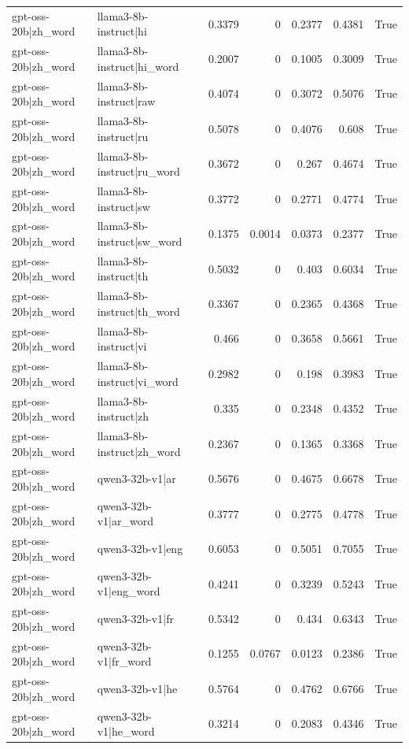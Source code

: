 \begin{table}
\begin{tabular}{l l r r r r l}
gpt-oss-20b|zh_word & llama3-8b-instruct|hi & 0.3379 & 0 & 0.2377 & 0.4381 & True \\
gpt-oss-20b|zh_word & llama3-8b-instruct|hi_word & 0.2007 & 0 & 0.1005 & 0.3009 & True \\
gpt-oss-20b|zh_word & llama3-8b-instruct|raw & 0.4074 & 0 & 0.3072 & 0.5076 & True \\
gpt-oss-20b|zh_word & llama3-8b-instruct|ru & 0.5078 & 0 & 0.4076 & 0.608 & True \\
gpt-oss-20b|zh_word & llama3-8b-instruct|ru_word & 0.3672 & 0 & 0.267 & 0.4674 & True \\
gpt-oss-20b|zh_word & llama3-8b-instruct|sw & 0.3772 & 0 & 0.2771 & 0.4774 & True \\
gpt-oss-20b|zh_word & llama3-8b-instruct|sw_word & 0.1375 & 0.0014 & 0.0373 & 0.2377 & True \\
gpt-oss-20b|zh_word & llama3-8b-instruct|th & 0.5032 & 0 & 0.403 & 0.6034 & True \\
gpt-oss-20b|zh_word & llama3-8b-instruct|th_word & 0.3367 & 0 & 0.2365 & 0.4368 & True \\
gpt-oss-20b|zh_word & llama3-8b-instruct|vi & 0.466 & 0 & 0.3658 & 0.5661 & True \\
gpt-oss-20b|zh_word & llama3-8b-instruct|vi_word & 0.2982 & 0 & 0.198 & 0.3983 & True \\
gpt-oss-20b|zh_word & llama3-8b-instruct|zh & 0.335 & 0 & 0.2348 & 0.4352 & True \\
gpt-oss-20b|zh_word & llama3-8b-instruct|zh_word & 0.2367 & 0 & 0.1365 & 0.3368 & True \\
gpt-oss-20b|zh_word & qwen3-32b-v1|ar & 0.5676 & 0 & 0.4675 & 0.6678 & True \\
gpt-oss-20b|zh_word & qwen3-32b-v1|ar_word & 0.3777 & 0 & 0.2775 & 0.4778 & True \\
gpt-oss-20b|zh_word & qwen3-32b-v1|eng & 0.6053 & 0 & 0.5051 & 0.7055 & True \\
gpt-oss-20b|zh_word & qwen3-32b-v1|eng_word & 0.4241 & 0 & 0.3239 & 0.5243 & True \\
gpt-oss-20b|zh_word & qwen3-32b-v1|fr & 0.5342 & 0 & 0.434 & 0.6343 & True \\
gpt-oss-20b|zh_word & qwen3-32b-v1|fr_word & 0.1255 & 0.0767 & 0.0123 & 0.2386 & True \\
gpt-oss-20b|zh_word & qwen3-32b-v1|he & 0.5764 & 0 & 0.4762 & 0.6766 & True \\
gpt-oss-20b|zh_word & qwen3-32b-v1|he_word & 0.3214 & 0 & 0.2083 & 0.4346 & True \\

\end{tabular}
\end{table}
